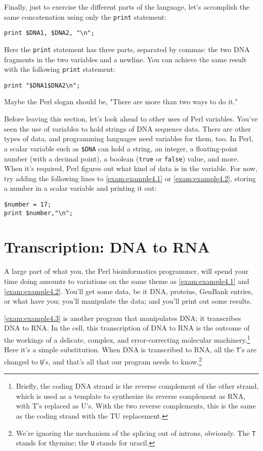 Finally, just to exercise the different parts of the language, let's accomplish the same concatenation using only the \verb|print| statement:

\begin{lstlisting}
print $DNA1, $DNA2, "\n";
\end{lstlisting}

Here the \verb|print| statement has three parts, separated by commas: the two DNA fragments in the two variables and a newline. You can achieve the same result with the following \verb|print| statement:

\begin{lstlisting}
print "$DNA1$DNA2\n";
\end{lstlisting}

Maybe the Perl slogan should be, "There are more than two ways to do it."

Before leaving this section, let's look ahead to other uses of Perl variables. You've seen the use of variables to hold strings of DNA sequence data. There are other types of data, and programming languages need variables for them, too. In Perl, a scalar variable such as \verb|$DNA| can hold a string, an integer, a floating-point number (with a decimal point), a boolean (\verb|true| or \verb|false|) value, and more. When it's required, Perl figures out what kind of data is in the variable. For now, try adding the following lines to \autoref{exam:example4.1} or \autoref{exam:example4.2}, storing a number in a scalar variable and printing it out:


\begin{lstlisting}
$number = 17;
print $number,"\n";
\end{lstlisting}

\section{Transcription: DNA to RNA}
A large part of what you, the Perl bioinformatics programmer, will spend your time doing amounts to variations on the same theme as \autoref{exam:example4.1} and \autoref{exam:example4.2}. You'll get some data, be it DNA, proteins, GenBank entries, or what have you; you'll manipulate the data; and you'll print out some results.

\autoref{exam:example4.3} is another program that manipulates DNA; it transcribes DNA to RNA. In the cell, this transcription of DNA to RNA is the outcome of the workings of a delicate, complex, and error-correcting molecular machinery.\footnote{Briefly, the coding DNA strand is the reverse complement of the other strand, which is used as a template to synthesize its reverse complement as RNA, with T's replaced as U's. With the two reverse complements, this is the same as the coding strand with the TU replacement.} Here it's a simple substitution. When DNA is transcribed to RNA, all the \verb|T|'s are changed to \verb|U|'s, and that's all that our program needs to know.\footnote{We're ignoring the mechanism of the splicing out of introns, obviously. The \verb|T| stands for thymine; the \verb|U| stands for uracil.}

